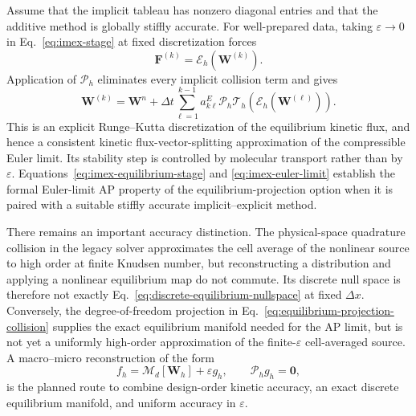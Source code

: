 \documentclass[preprint,3p,12pt]{elsarticle}
\newcommand{\vct}[1]{\boldsymbol{#1}}
\begin{document}
Assume that the implicit tableau has nonzero diagonal entries and that the additive method is globally stiffly accurate. For well-prepared data, taking $\varepsilon\to0$ in Eq.~\eqref{eq:imex-stage} at fixed discretization forces
\begin{equation}
  \vct{F}^{(k)}
  =\mathcal{E}_h\left(\vct{W}^{(k)}\right).
  \label{eq:imex-equilibrium-stage}
\end{equation}
Application of $\mathcal{P}_h$ eliminates every implicit collision term and gives
\begin{equation}
  \vct{W}^{(k)}
  =\vct{W}^{n}
  +\Delta t\sum_{\ell=1}^{k-1}a^{E}_{k\ell}
  \mathcal{P}_h\mathcal{T}_h
  \left(\mathcal{E}_h(\vct{W}^{(\ell)})\right).
  \label{eq:imex-euler-limit}
\end{equation}
This is an explicit Runge--Kutta discretization of the equilibrium kinetic flux, and hence a consistent kinetic flux-vector-splitting approximation of the compressible Euler limit. Its stability step is controlled by molecular transport rather than by $\varepsilon$. Equations~\eqref{eq:imex-equilibrium-stage} and \eqref{eq:imex-euler-limit} establish the formal Euler-limit AP property of the equilibrium-projection option when it is paired with a suitable stiffly accurate implicit--explicit method.

There remains an important accuracy distinction. The physical-space quadrature collision in the legacy solver approximates the cell average of the nonlinear source to high order at finite Knudsen number, but reconstructing a distribution and applying a nonlinear equilibrium map do not commute. Its discrete null space is therefore not exactly Eq.~\eqref{eq:discrete-equilibrium-nullspace} at fixed $\Delta x$. Conversely, the degree-of-freedom projection in Eq.~\eqref{eq:equilibrium-projection-collision} supplies the exact equilibrium manifold needed for the AP limit, but is not yet a uniformly high-order approximation of the finite-$\varepsilon$ cell-averaged source. A macro--micro reconstruction of the form
\begin{equation}
  f_h=\mathcal{M}_d[\vct{W}_h]+\varepsilon g_h,
  \qquad \mathcal{P}_h g_h=\vct{0},
  \label{eq:macro-micro-reconstruction}
\end{equation}
is the planned route to combine design-order kinetic accuracy, an exact discrete equilibrium manifold, and uniform accuracy in $\varepsilon$.
\end{document}
